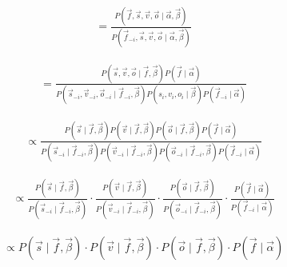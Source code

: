 \documentclass{article}
\begin{document}
\begin{equation}
\begin{aligned}
&= \frac{P(\vec{f}, \vec{s}, \vec{v}, \vec{o} \mid \vec{\alpha}, \vec{\beta})}{P(\vec{f}_{-i}, \vec{s}, \vec{v}, \vec{o} \mid \vec{\alpha}, \vec{\beta})}
\end{aligned}
\end{equation}


\begin{equation}
\begin{aligned}
&= \frac{P(\vec{s}, \vec{v}, \vec{o} \mid  \vec{f}, \vec{\beta}) P(\vec{f} \mid \vec{\alpha}) }{P(\vec{s}_{-i}, \vec{v}_{-i}, \vec{o}_{-i} \mid  \vec{f}_{-i}, \vec{\beta}) P(s_i, v_i, o_i \mid \vec{\beta} )  P(\vec{f}_{-i} \mid \vec{\alpha}) }
\end{aligned}
\end{equation}

\begin{equation}
\begin{aligned}
&\propto \frac{P(\vec{s} \mid  \vec{f}, \vec{\beta}) P(\vec{v}\mid  \vec{f}, \vec{\beta}) P(\vec{o} \mid  \vec{f}, \vec{\beta})   P(\vec{f} \mid \vec{\alpha}) }{P(\vec{s}_{-i} \mid  \vec{f}_{-i}, \vec{\beta}) P(\vec{v}_{-i} \mid  \vec{f}_{-i}, \vec{\beta}) P(\vec{o}_{-i} \mid  \vec{f}_{-i}, \vec{\beta})   P(\vec{f}_{-i} \mid \vec{\alpha})}
\end{aligned}
\end{equation}


\begin{equation}
\begin{aligned}
&\propto \frac{P(\vec{s} \mid  \vec{f}, \vec{\beta}) }{P(\vec{s}_{-i} \mid  \vec{f}_{-i}, \vec{\beta}) } \cdot \frac{P(\vec{v}\mid  \vec{f}, \vec{\beta})}{P(\vec{v}_{-i} \mid  \vec{f}_{-i}, \vec{\beta}) } \cdot\frac{P(\vec{o} \mid  \vec{f}, \vec{\beta})}{P(\vec{o}_{-i} \mid  \vec{f}_{-i}, \vec{\beta}) } \cdot \frac{P(\vec{f} \mid \vec{\alpha})}{P(\vec{f}_{-i} \mid \vec{\alpha})}
\end{aligned}
\end{equation}



\begin{equation}
\begin{aligned}
& \propto P(\vec{s} \mid  \vec{f}, \vec{\beta}) \cdot P(\vec{v}\mid  \vec{f}, \vec{\beta}) \cdot  P(\vec{o} \mid  \vec{f}, \vec{\beta}) \cdot P(\vec{f} \mid \vec{\alpha})
\end{aligned}
\end{equation}
\end{document}
